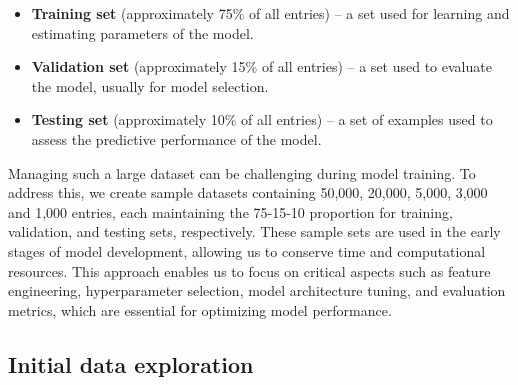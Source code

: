 \vspace{3mm}

\begin{itemize}
    \item \textbf{Training set} (approximately 75\% of all entries) --  a set used for learning and estimating parameters of the model.
    \item \textbf{Validation set} (approximately 15\% of all entries) -- a set used to evaluate the model, usually for model selection.
    \item \textbf{Testing set} (approximately 10\% of all entries) -- a set of examples used to assess the predictive performance of the model.
\end{itemize}

\vspace{3mm}

Managing such a large dataset can be challenging during model training. To address this, we create sample datasets containing 50,000, 20,000, 5,000, 3,000 and 1,000 entries, each maintaining the 75-15-10 proportion for training, validation, and testing sets, respectively. These sample sets are used in the early stages of model development, allowing us to conserve time and computational resources. This approach enables us to focus on critical aspects such as feature engineering, hyperparameter selection, model architecture tuning, and evaluation metrics, which are essential for optimizing model performance.

\vspace{3mm}

\subsection*{Initial data exploration}
\label{Data Exploration}





